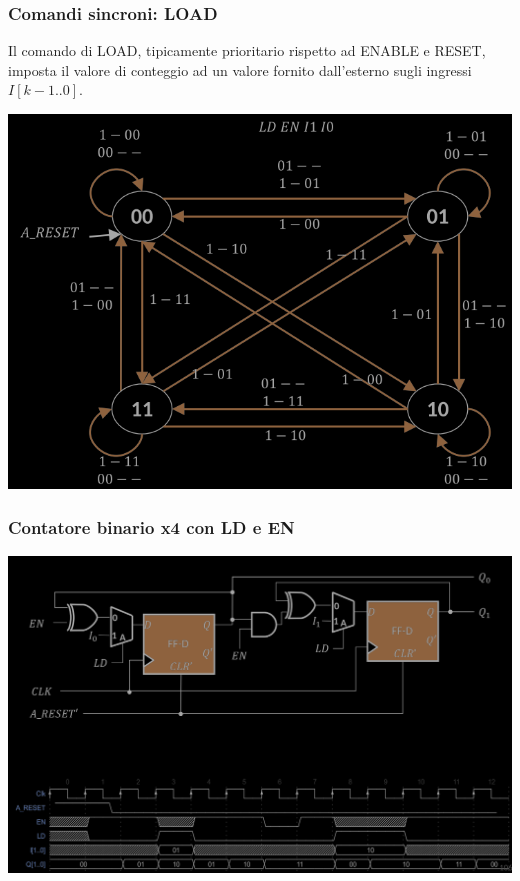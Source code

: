 \documentclass{article}
\begin{document}
\subsubsection{Comandi sincroni: LOAD}
Il comando di LOAD, tipicamente prioritario rispetto ad ENABLE e RESET, imposta il valore di conteggio ad un valore fornito dall’esterno sugli ingressi $I[k-1..0]$.
\begin{center}
    \includegraphics[scale=0.4]{load grafico.png}
\end{center}
\subsubsection*{Contatore binario x4 con LD e EN}
\begin{center}
    \includegraphics[scale=0.4]{contatore binario LD EN.png}
\end{center}
\end{document}
